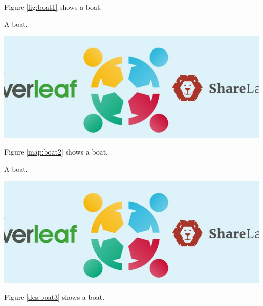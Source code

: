 Figure \ref{fig:boat1} shows a boat.


\begin{mapa}
	\caption{A boat.}
	\includegraphics[width=\linewidth]{2-textuais/figs/Overleaf-750x300.jpg}
	\label{map:boat2}
\end{mapa}

Figure \ref{map:boat2} shows a boat.

\begin{desenho}
	\caption{A boat.}
	\includegraphics[width=\linewidth]{2-textuais/figs/Overleaf-750x300.jpg}
	\label{des:boat3}
\end{desenho}

Figure \ref{des:boat3} shows a boat.

